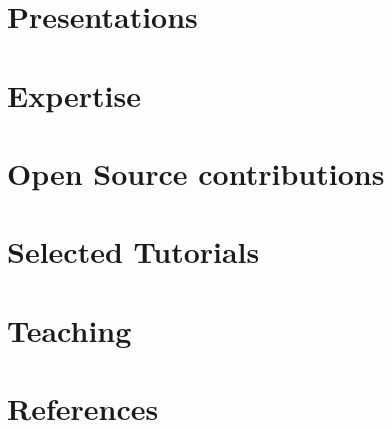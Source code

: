 \documentclass[11pt]{article} %
\begin{document}
\section*{Presentations}
\label{presentations}




\section*{Expertise}
\label{expertise}



\section*{Open Source contributions}
\label{tools}




\section*{Selected Tutorials}
\label{tutorials}



\section*{Teaching}
\label{teaching}



\section*{References}
\label{references}

\end{document}
